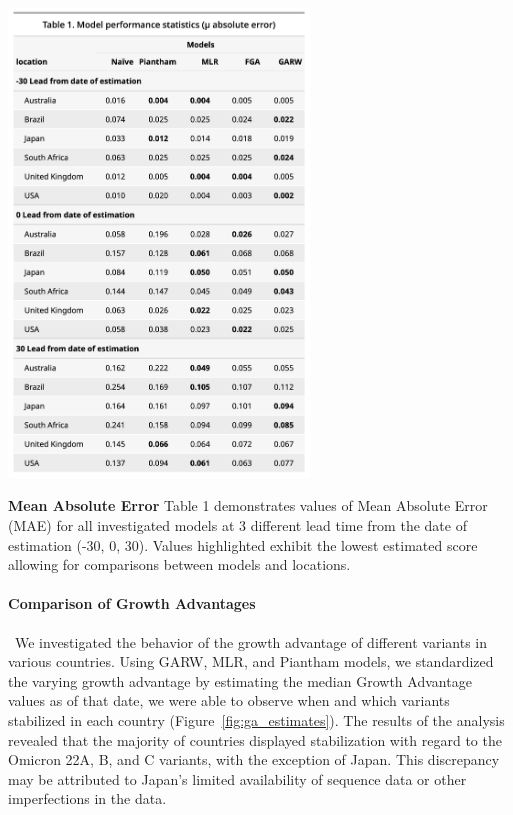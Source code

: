 \documentclass[11pt,oneside,letterpaper]{article}
\begin{document}
\begin{table}[H]
	\centering
	\includegraphics[width=0.6\textwidth]{figures/model_comp_table.png}
	\caption{\textbf{Mean Absolute Error}
	Table 1 demonstrates values of Mean Absolute Error (MAE) for all investigated models at 3 different lead time from the date of estimation (-30, 0, 30). 
	Values highlighted exhibit the lowest estimated score allowing for comparisons between models and locations.
	}
	\label{table:model_comp_table}
\end{table}

\paragraph{Comparison of Growth Advantages}\ We investigated the behavior of the growth advantage of different variants in various countries.
Using GARW, MLR, and Piantham models, we standardized the varying growth advantage by estimating the median Growth Advantage values as of that date, we were able to observe when and which variants stabilized in each country (Figure~\ref{fig:ga_estimates}). 
The results of the analysis revealed that the majority of countries displayed stabilization with regard to the Omicron 22A, B, and C variants, with the exception of Japan.
This discrepancy may be attributed to Japan's limited availability of sequence data or other imperfections in the data.
\end{document}
